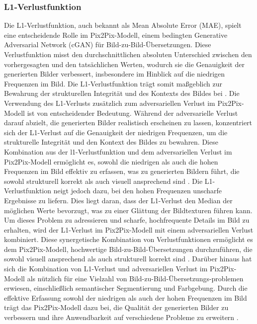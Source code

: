 \subsubsection{L1-Verlustfunktion}

Die L1-Verlustfunktion, auch bekannt als Mean Absolute Error (MAE), spielt eine entscheidende Rolle im Pix2Pix-Modell, einem bedingten Generative Adversarial Network (cGAN) für Bild-zu-Bild-Übersetzungen. Diese Verlustfunktion misst den durchschnittlichen absoluten Unterschied zwischen den vorhergesagten und den tatsächlichen Werten, wodurch sie die Genauigkeit der generierten Bilder verbessert, insbesondere im Hinblick auf die niedrigen Frequenzen im Bild. Die L1-Verlustfunktion trägt somit maßgeblich zur Bewahrung der strukturellen Integrität und des Kontexts des Bildes bei \cite{PhillipIsola.}. \newline
Die Verwendung des L1-Verlusts zusätzlich zum adversariellen Verlust im Pix2Pix-Modell ist von entscheidender Bedeutung. Während der adversarielle Verlust darauf abzielt, die generierten Bilder realistisch erscheinen zu lassen, konzentriert sich der L1-Verlust auf die Genauigkeit der niedrigen Frequenzen, um die strukturelle Integrität und den Kontext des Bildes zu bewahren. Diese Kombination aus der l1-Verlustfunktion und dem adversariellen Verlust im Pix2Pix-Modell ermöglicht es, sowohl die niedrigen als auch die hohen Frequenzen im Bild effektiv zu erfassen, was zu generierten Bildern führt, die sowohl strukturell korrekt als auch visuell ansprechend sind \cite{PhillipIsola.}. \newline
Die L1-Verlustfunktion neigt jedoch dazu, bei den hohen Frequenzen unscharfe Ergebnisse zu liefern. Dies liegt daran, dass der L1-Verlust den Median der möglichen Werte bevorzugt, was zu einer Glättung der Bildtexturen führen kann. Um dieses Problem zu adressieren und scharfe, hochfrequente Details im Bild zu erhalten, wird der L1-Verlust im Pix2Pix-Modell mit einem adversariellen Verlust kombiniert. Diese synergetische Kombination von Verlustfunktionen ermöglicht es dem Pix2Pix-Modell, hochwertige Bild-zu-Bild-Übersetzungen durchzuführen, die sowohl visuell ansprechend als auch strukturell korrekt sind \cite{PhillipIsola.}. \newline
Darüber hinaus hat sich die Kombination von L1-Verlust und adversariellen Verlust im Pix2Pix-Modell als nützlich für eine Vielzahl von Bild-zu-Bild-Übersetzungs-problemen erwiesen, einschließlich semantischer Segmentierung und Farbgebung. Durch die effektive Erfassung sowohl der niedrigen als auch der hohen Frequenzen im Bild trägt das Pix2Pix-Modell dazu bei, die Qualität der generierten Bilder zu verbessern und ihre Anwendbarkeit auf verschiedene Probleme zu erweitern \cite{PhillipIsola.}.

